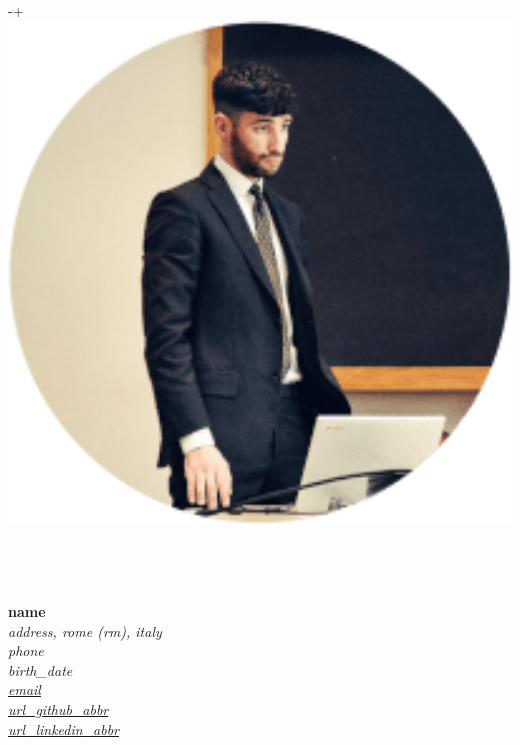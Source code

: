 \documentclass{article}
\begin{document}

\begin{minipage}[t]{.25\textwidth}
	\raisebox
	{\dimexpr-\height+\ht\strutbox\relax}
	{\includegraphics[width=1\textwidth]{profile.png}} \hfill \\\\\\\\
\end{minipage}
\begin{minipage}[t]{.7\textwidth}
	\begin{flushright}
		\vfill \textbf{\huge{{{name}}}} \\ \hfill \vfill
		\textit{
			{{address}}, {{rome}} ({{rm}}), {{italy}} \hspace{1mm} \color{lightergray}\faHome\color{black} \\
			{{phone}} \hspace{1mm} \color{lightergray}\faPhone\color{black} \\
			{{birth_date}} \hspace{1mm} \color{lightergray}\faCalendar\color{black} \\
			\href{mailto:{{email}}}{{{email}}} \hspace{1mm} \color{lightergray}\faEnvelope\color{black} \\
			\href{{{url_github}}}{{{url_github_abbr}}} \hspace{1mm} \color{lightergray}\faGithubSquare\color{black} \\
			\href{{{url_linkedin}}}{{{url_linkedin_abbr}}} \hspace{1mm} \color{lightergray}\faLinkedinSquare\color{black} \\
		}
	\end{flushright}
\end{minipage}
\end{document}

